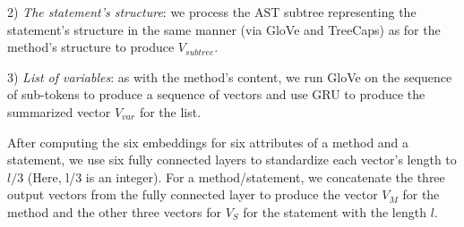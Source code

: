 



2) {\em The statement's structure}: we process the AST
subtree representing the statement's structure in the same manner (via
GloVe and TreeCaps) as for the method's structure to produce
$V_{subtree}$.



3) {\em List of variables}: as with the method's content,
we run GloVe on the sequence of sub-tokens to produce a sequence of
vectors and use GRU to produce the summarized vector $V_{var}$ for the
list.





After computing the six embeddings for six attributes of a method and
a statement, we use six fully connected layers to standardize each
vector's length to $l/3$ (Here, l/3 is an integer). For a
method/statement, we concatenate the three output vectors from the
fully connected layer to produce the vector $V_{M}$ for the method and
the other three vectors for $V_{S}$ for the statement with the length
$l$.


